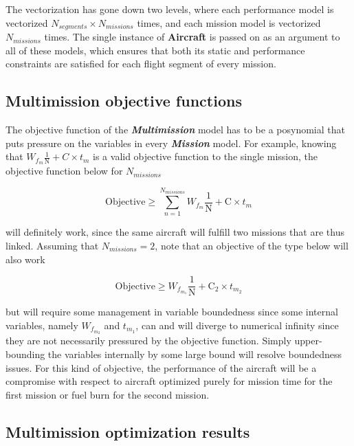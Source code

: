 The vectorization has gone down two levels, where each performance model is vectorized $N_{segments} \times N_{missions}$ times,
and each mission model is vectorized $N_{missions}$ times. The single instance of \textbf{Aircraft}
is passed on as an argument to all of these models, which ensures that both its
static and performance constraints are satisfied for each flight segment
of every mission.

\subsection{Multimission objective functions}

The objective function of the \textbf{\textit{Multimission}} model has to be
a posynomial that puts pressure on the variables in every \textbf{\textit{Mission}} model. For example, knowing that
$W_{f_m} \frac{1}{\mathrm{N}} + C \times t_{m}$ is a valid objective function to the single mission,
the objective function below for $N_{missions}$

\begin{equation}
    \mathrm{Objective} \geq \sum_{n=1}^{N_{missions}} W_{f_m} \frac{1}{\mathrm{N}} + \mathrm{C} \times t_{m}
    \label{e:compObj}
\end{equation}

will definitely work, since the same aircraft will fulfill two missions that are thus linked.
Assuming that $N_{missions} = 2$, note that an objective of the type below will also work

\begin{equation}
    \mathrm{Objective} \geq W_{f_{m_{1}}} \frac{1}{\mathrm{N}} + \mathrm{C}_{2} \times t_{m_{2}}
    \label{e:sepObj}
\end{equation}

but will require some management in variable boundedness since some internal variables,
namely  $W_{f_{m_{2}}}$ and $t_{m_{1}}$, can and will diverge to numerical infinity since they
are not necessarily pressured by the objective function.
Simply upper-bounding the variables
internally by some large bound will resolve boundedness issues. For this kind of objective, the
performance of the aircraft will be a compromise with respect to aircraft optimized purely
for mission time for the first mission or fuel burn for the second mission.

\subsection{Multimission optimization results}

